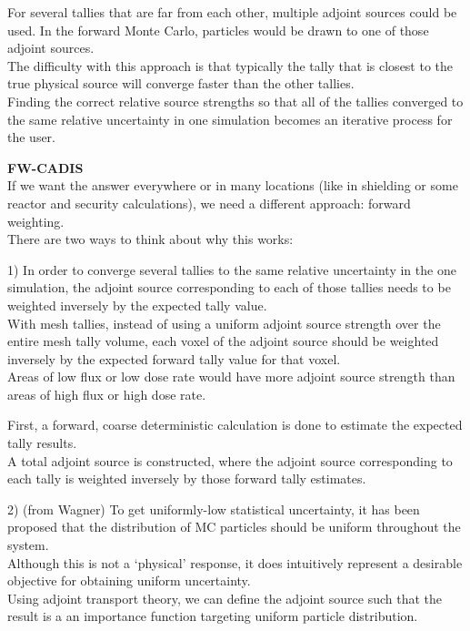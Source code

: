 \documentclass[12pt]{article}
\begin{document}
For several tallies that are far from each other, multiple adjoint sources could be used. In the forward Monte Carlo, particles would be drawn to one of those adjoint sources.\\
The difficulty with this approach is that typically the tally that is closest to the true physical source will converge faster than the other tallies.\\
Finding the correct relative source strengths so that all of the tallies converged to the same relative uncertainty in one simulation becomes an iterative process for the user.

\textbf{FW-CADIS}\\
If we want the answer everywhere or in many locations (like in shielding or some reactor and security calculations), we need a different approach: forward weighting.\\
There are two ways to think about why this works:

1) In order to converge several tallies to the same relative uncertainty in the one simulation, the adjoint source corresponding to each of those tallies needs to be weighted inversely by the expected tally value.\\
With mesh tallies, instead of using a uniform adjoint source strength over the entire mesh tally volume, each voxel of the adjoint source should be weighted inversely by the expected forward tally value for that voxel.\\
Areas of low flux or low dose rate would have more adjoint source strength than areas of high flux or high dose rate.

First, a forward, coarse deterministic calculation is done to estimate the expected tally results. \\
A total adjoint source is constructed, where the adjoint source corresponding to each tally is weighted inversely by those forward tally estimates.\

2) (from Wagner) To get uniformly-low statistical uncertainty, it has been proposed that the distribution of MC particles should be uniform throughout the system.\\
Although this is not a `physical' response, it does intuitively represent a desirable objective for obtaining uniform uncertainty.\\
Using adjoint transport theory, we can define the adjoint source such that the result is a an importance function targeting uniform particle distribution.
\end{document}
